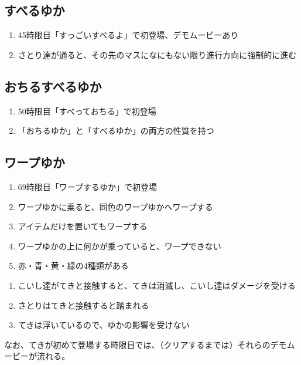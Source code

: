 \subsection{すべるゆか}
\begin{enumerate}[label={\sarrow}]
\item 45時限目「すっごいすべるよ」で初登場、デモムービーあり
\item さとり達が通ると、その先のマスになにもない限り進行方向に強制的に進む
\end{enumerate}


\subsection{おちるすべるゆか}
\begin{enumerate}[label={\sarrow}]
\item 50時限目「すべっておちる」で初登場
\item 「おちるゆか」と「すべるゆか」の両方の性質を持つ
\end{enumerate}


\clearpage
\subsection{ワープゆか}
\begin{enumerate}[label={\sarrow}]
\item 69時限目「ワープするゆか」で初登場
\item ワープゆかに乗ると、同色のワープゆかへワープする
\item アイテムだけを置いてもワープする
\item ワープゆかの上に何かが乗っていると、ワープできない
\item 赤・青・黄・緑の4種類がある
\end{enumerate}


\clearpage
\begin{enumerate}[label={\sarrow}]
\item こいし達がてきと接触すると、てきは消滅し、こいし達はダメージを受ける
\item さとりはてきと接触すると踏まれる
\item てきは浮いているので、ゆかの影響を受けない
\end{enumerate}
なお、てきが初めて登場する時限目では、（クリアするまでは）それらのデモムービーが流れる。


